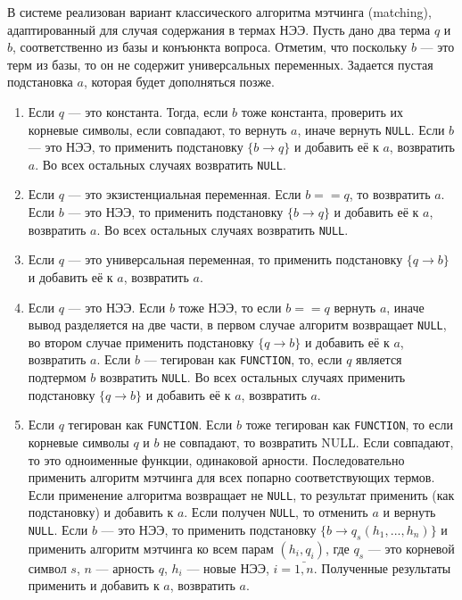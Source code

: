 В системе реализован вариант классического алгоритма мэтчинга (mat\-ching), адаптированный для случая содержания в термах НЭЭ. Пусть дано два терма $q$ и $b$, соответственно из базы и конъюнкта вопроса. Отметим, что поскольку $b$ --- это терм из базы, то он не содержит универсальных переменных. Задается пустая подстановка $a$, которая будет дополняться позже.
\begin{enumerate}
\item Если $q$ --- это константа. Тогда, если $b$ тоже константа, проверить их корневые символы, если совпадают, то вернуть $a$, иначе вернуть \texttt{NULL}. Если $b$ --- это НЭЭ, то применить подстановку $\{b \rightarrow q\}$ и добавить её к $a$, возвратить $a$. Во всех остальных случаях возвратить \texttt{NULL}.

\item Если $q$ --- это экзистенциальная переменная. Если $b==q$, то возвратить $a$. Если $b$ --- это НЭЭ, то применить подстановку $\{b \rightarrow q\}$ и добавить её к $a$, возвратить $a$. Во всех остальных случаях возвратить \texttt{NULL}.

\item Если $q$ --- это универсальная переменная, то применить подстановку $\{q \rightarrow b\}$ и добавить её к $a$, возвратить $a$.

\item Если $q$ --- это НЭЭ. Если $b$ тоже НЭЭ, то если $b==q$ вернуть $a$, иначе вывод разделяется на две части, в первом случае алгоритм возвращает \texttt{NULL}, во втором случае применить подстановку $\{q \rightarrow b\}$ и добавить её к $a$, возвратить $a$. Если $b$ --- тегирован как \texttt{FUNCTION}, то, если $q$ является подтермом $b$ возвратить \texttt{NULL}. Во всех остальных случаях применить подстановку $\{q \rightarrow b\}$ и добавить её к $a$, возвратить $a$.

\item Если $q$ тегирован как \texttt{FUNCTION}. Если $b$ тоже тегирован как \texttt{FUNCTION}, то если корневые символы $q$ и $b$ не совпадают, то возвратить NULL. Если совпадают, то это одноименные функции, одинаковой арности. Последовательно применить алгоритм мэтчинга для всех попарно соответствующих термов. Если применение алгоритма возвращает не \texttt{NULL}, то результат применить (как подстановку) и добавить к $a$. Если получен \texttt{NULL}, то отменить $a$ и вернуть \texttt{NULL}. Если $b$ --- это НЭЭ, то применить подстановку $\{b \rightarrow q_s(h_1,...,h_n)\}$ и применить алгоритм мэтчинга ко всем парам $(h_i, q_i)$, где $q_s$ --- это корневой символ $s$, $n$ --- арность $q$, $h_i$ --- новые НЭЭ, $i = \bar{1,n}$. Полученные результаты применить и добавить к  $a$, возвратить $a$.
\end{enumerate}






